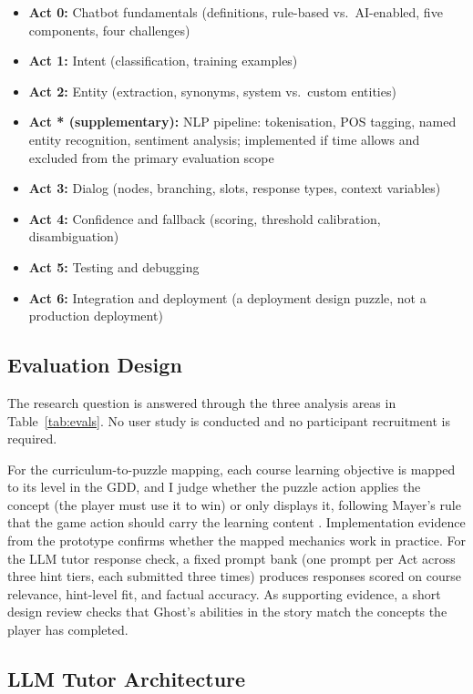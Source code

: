 \documentclass[11pt,a4paper]{article}
\begin{document}
\begin{itemize}[leftmargin=1.5em, itemsep=2pt]
  \item \textbf{Act 0:} Chatbot fundamentals (definitions, rule-based vs.\ AI-enabled, five components, four challenges)
  \item \textbf{Act 1:} Intent (classification, training examples)
  \item \textbf{Act 2:} Entity (extraction, synonyms, system vs.\ custom entities)
  \item \textbf{Act * (supplementary):} NLP pipeline: tokenisation, POS tagging, named entity recognition, sentiment analysis; implemented if time allows and excluded from the primary evaluation scope
  \item \textbf{Act 3:} Dialog (nodes, branching, slots, response types, context variables)
  \item \textbf{Act 4:} Confidence and fallback (scoring, threshold calibration, disambiguation)
  \item \textbf{Act 5:} Testing and debugging
  \item \textbf{Act 6:} Integration and deployment (a deployment design puzzle, not a production deployment)
\end{itemize}

\subsection{Evaluation Design}

The research question is answered through the three analysis areas in Table~\ref{tab:evals}. No user study is conducted and no participant recruitment is required.

For the curriculum-to-puzzle mapping, each course learning objective is mapped to its level in the GDD, and I judge whether the puzzle action applies the concept (the player must use it to win) or only displays it, following Mayer's rule that the game action should carry the learning content \cite{mayer2019}. Implementation evidence from the prototype confirms whether the mapped mechanics work in practice. For the LLM tutor response check, a fixed prompt bank (one prompt per Act across three hint tiers, each submitted three times) produces responses scored on course relevance, hint-level fit, and factual accuracy. As supporting evidence, a short design review checks that Ghost's abilities in the story match the concepts the player has completed.

\subsection{LLM Tutor Architecture}
\end{document}
